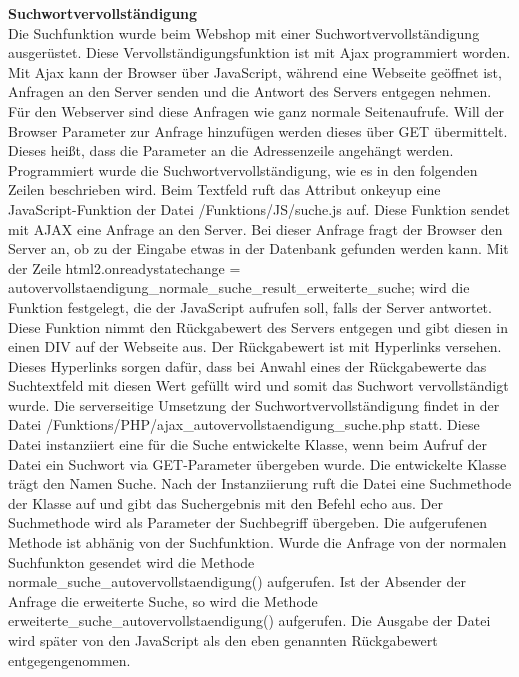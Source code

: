 \textbf{Suchwortvervollständigung}\\
Die Suchfunktion wurde beim Webshop mit einer Suchwortvervollständigung ausgerüstet. Diese Vervollständigungsfunktion ist mit Ajax programmiert worden. Mit Ajax kann der Browser über JavaScript, während eine Webseite geöffnet ist, Anfragen an den Server senden und die Antwort des Servers entgegen nehmen. Für den Webserver sind diese Anfragen wie ganz normale Seitenaufrufe. Will der Browser Parameter zur Anfrage hinzufügen werden dieses über \glqq GET\grqq{} übermittelt. Dieses heißt, dass die Parameter an die Adressenzeile angehängt werden.\\
Programmiert wurde die Suchwortvervollständigung, wie es in den folgenden Zeilen beschrieben wird. Beim Textfeld ruft das Attribut \glqq onkeyup\grqq{} eine JavaScript-Funktion der Datei \glqq /Funktions/JS/suche.js\grqq{} auf. Diese Funktion sendet mit AJAX eine Anfrage an den Server. Bei dieser Anfrage fragt der Browser den Server an, ob zu der Eingabe etwas in der Datenbank gefunden werden kann. Mit der Zeile \glqq html2.onreadystatechange = autovervollstaendigung\_normale\_suche\_result\_erweiterte\_suche;\grqq{} wird die Funktion festgelegt, die der JavaScript aufrufen soll, falls der Server antwortet. Diese Funktion nimmt den Rückgabewert des Servers entgegen und gibt diesen in einen DIV auf der Webseite aus.  Der Rückgabewert ist mit Hyperlinks versehen. Dieses Hyperlinks sorgen dafür, dass bei Anwahl eines der Rückgabewerte das Suchtextfeld mit diesen Wert gefüllt wird und somit das Suchwort vervollständigt wurde. Die serverseitige Umsetzung der Suchwortvervollständigung findet in der Datei \glqq /Funktions/PHP/ajax\_autovervollstaendigung\_suche.php\grqq{} statt. Diese Datei instanziiert eine für die Suche entwickelte Klasse, wenn beim Aufruf der Datei ein Suchwort via GET-Parameter übergeben wurde. Die entwickelte Klasse trägt den Namen  \glqq Suche\grqq{}. Nach der Instanziierung ruft die Datei eine Suchmethode der Klasse auf und gibt das Suchergebnis mit den Befehl \glqq echo\grqq{} aus. Der Suchmethode wird als Parameter der Suchbegriff übergeben. Die aufgerufenen Methode ist abhänig von der Suchfunktion. Wurde die Anfrage von der \glqq normalen\grqq{} Suchfunkton gesendet wird die Methode \glqq normale\_suche\_autovervollstaendigung()\grqq{} aufgerufen. Ist der Absender der Anfrage die \glqq erweiterte\grqq{} Suche, so wird die Methode \glqq erweiterte\_suche\_autovervollstaendigung()\grqq{} aufgerufen. Die Ausgabe der Datei wird später von den JavaScript als den eben genannten Rückgabewert entgegengenommen. \\

